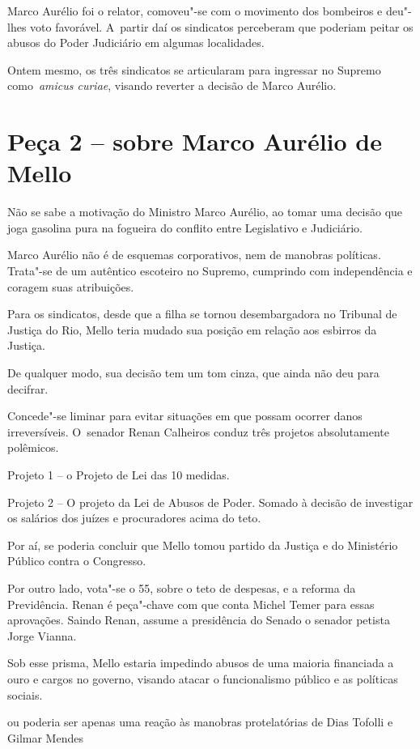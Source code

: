 Marco Aurélio foi o relator, comoveu"-se com o movimento dos bombeiros e
deu"-lhes voto favorável. A~partir daí os sindicatos perceberam que
poderiam peitar os abusos do Poder Judiciário em algumas localidades.

Ontem mesmo, os três sindicatos se articularam para ingressar no Supremo
como~\emph{amicus curiae}, visando reverter a decisão de Marco Aurélio.

\section{Peça 2 -- sobre Marco Aurélio de Mello}

Não se sabe a motivação do Ministro Marco Aurélio, ao tomar uma decisão
que joga gasolina pura na fogueira do conflito entre Legislativo e
Judiciário.

Marco Aurélio não é de esquemas corporativos, nem de manobras políticas.
Trata"-se de um autêntico escoteiro no Supremo, cumprindo com
independência e coragem suas atribuições.

Para os sindicatos, desde que a filha se tornou desembargadora no
Tribunal de Justiça do Rio, Mello teria mudado sua posição em relação
aos esbirros da Justiça.

De qualquer modo, sua decisão tem um tom cinza, que ainda não deu para
decifrar.

Concede"-se liminar para evitar situações em que possam ocorrer danos
irreversíveis. O~senador Renan Calheiros conduz três projetos
absolutamente polêmicos.

Projeto 1 -- o Projeto de Lei das 10 medidas.

Projeto 2 -- O projeto da Lei de Abusos de Poder. Somado à decisão de
investigar os salários dos juízes e procuradores acima do teto.

Por aí, se poderia concluir que Mello tomou partido da Justiça e do
Ministério Público contra o Congresso.

Por outro lado, vota"-se o  55, sobre o teto de despesas, e a reforma
da Previdência. Renan é peça"-chave com que conta Michel Temer para essas
aprovações. Saindo Renan, assume a presidência do Senado o senador
petista Jorge Vianna.

Sob esse prisma, Mello estaria impedindo abusos de uma maioria
financiada a ouro e cargos no governo, visando atacar o funcionalismo
público e as políticas sociais.

ou poderia ser apenas uma reação às manobras protelatórias de Dias
Tofolli e Gilmar Mendes

